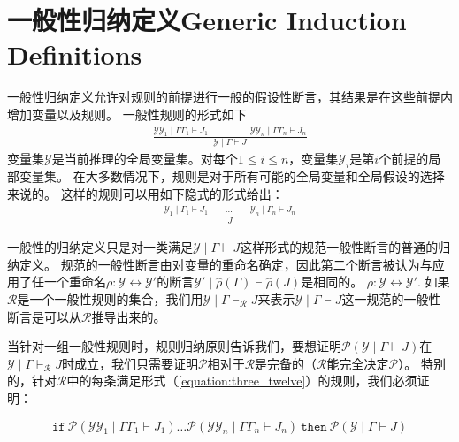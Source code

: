 \section{一般性归纳定义Generic Induction Definitions}
一般性归纳定义允许对规则的前提进行一般的假设性断言，其结果是在这些前提内增加变量以及规则。
一般性规则的形式如下
\begin{equation}
    \begin{aligned}
        \frac{\mathcal{YY}_1 \mid \Gamma \Gamma_1 \vdash J_1 \qquad \dots \qquad \mathcal{YY}_n \mid \Gamma \Gamma_n \vdash J_n}{\mathcal{Y} \mid \Gamma \vdash J} \label{equation:three_twelve}
    \end{aligned}
\end{equation}
变量集$\mathcal{Y}$是当前推理的全局变量集。对每个$1 \le i \le n$，变量集$\mathcal{Y}_i$是第$i$个前提的局部变量集。
在大多数情况下，规则是对于所有可能的全局变量和全局假设的选择来说的。
这样的规则可以用如下隐式的形式给出：
\begin{equation}
    \begin{aligned}
        \frac{\mathcal{Y}_1 \mid \Gamma_1 \vdash J_1 \qquad \dots \qquad \mathcal{Y}_n \mid \Gamma_n \vdash J_n}{J}
    \end{aligned}
\end{equation}

一般性的归纳定义只是对一类满足$ \mathcal{Y} \mid \Gamma \vdash J$这样形式的规范一般性断言的普通的归纳定义。
规范的一般性断言由对变量的重命名确定，因此第二个断言被认为与应用了任一个重命名$\rho : \mathcal{Y} \leftrightarrow \mathcal{Y}'$的断言$\mathcal{Y}' \mid \widehat{\rho}(\Gamma) \vdash \widehat{\rho}(J) $是相同的。
$\rho : \mathcal{Y} \leftrightarrow \mathcal{Y}'$.
如果$\mathcal{R}$是一个一般性规则的集合，我们用$\mathcal{Y} \mid \Gamma \vdash_{\mathcal{R}} J$来表示$\mathcal{Y} \mid \Gamma \vdash J$这一规范的一般性断言是可以从$\mathcal{R}$推导出来的。

当针对一组一般性规则时，规则归纳原则告诉我们，要想证明$\mathcal{P}(\mathcal{Y} \mid \Gamma \vdash J)$在$\mathcal{Y} \mid \Gamma \vdash_{\mathcal{R}} J$时成立，我们只需要证明$\mathcal{P}$相对于$\mathcal{R}$是完备的（$\mathcal{R}$能完全决定$\mathcal{P}$）。
特别的，针对$\mathcal{R}$中的每条满足形式（\ref{equation:three_twelve}）的规则，我们必须证明：

$$\mathtt{if} \  \mathcal{P} (\mathcal{Y}\mathcal{Y}_1 \mid \Gamma \Gamma_1 \vdash J_1) \dots \mathcal{P} (\mathcal{Y} \mathcal{Y}_n \mid \Gamma \Gamma_n \vdash J_n) \  \mathtt{then} \  \mathcal{P} (\mathcal{\mathcal{Y}} \mid \Gamma \vdash J)$$

